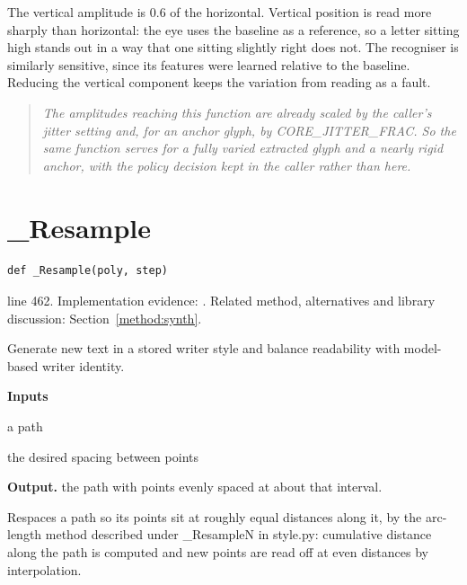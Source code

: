 The vertical amplitude is 0.6 of the horizontal. Vertical position is read more sharply than horizontal: the eye uses the baseline as a reference, so a letter sitting high stands out in a way that one sitting slightly right does not. The recogniser is similarly sensitive, since its features were learned relative to the baseline. Reducing the vertical component keeps the variation from reading as a fault.


\begin{quote}\small\itshape The amplitudes reaching this function are already scaled by the caller's jitter setting and, for an anchor glyph, by CORE\_JITTER\_FRAC. So the same function serves for a fully varied extracted glyph and a nearly rigid anchor, with the policy decision kept in the caller rather than here.\end{quote}


\section{\_Resample}\label{fn:synthesise:-Resample}
\begin{lstlisting}[style=sig]
def _Resample(poly, step)
\end{lstlisting}
 line 462. Implementation evidence: \cite{code2026}. Related method, alternatives and library discussion: Section~\ref{method:synth}.


Generate new text in a stored writer style and balance readability with model-based writer identity.




\noindent\textbf{Inputs}
\begin{description}[leftmargin=2.2em,style=nextline,font=\normalfont\ttfamily]\setlength\itemsep{1pt}
  \item[{poly}] \normalfont a path
  \item[{step}] \normalfont the desired spacing between points
\end{description}

\noindent\textbf{Output.} the path with points evenly spaced at about that interval.


Respaces a path so its points sit at roughly equal distances along it, by the arc-length method described under \_ResampleN in style.py: cumulative distance along the path is computed and new points are read off at even distances by interpolation.


